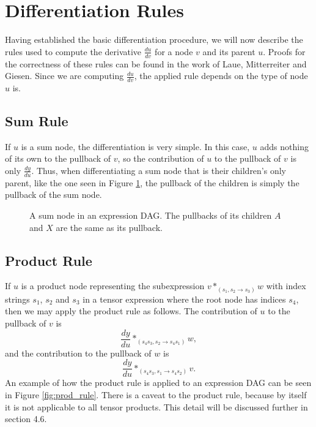 \documentclass[12pt, a4paper]{report}
\begin{document}
\section{Differentiation Rules}
Having established the basic differentiation procedure, we will now describe the rules used to compute the derivative $\frac{du}{dv}$ for a node $v$ and its parent $u$.
Proofs for the correctness of these rules can be found in the work \cite{tensorpaper} of Laue, Mitterreiter and Giesen.
Since we are computing $\frac{du}{dv}$, the applied rule depends on the type of node $u$ is.

\subsection{Sum Rule}
If $u$ is a sum node, the differentiation is very simple.
In this case, $u$ adds nothing of its own to the pullback of $v$, so the contribution of $u$ to the pullback of $v$ is only $\frac{dy}{du}$.
Thus, when differentiating a sum node that is their children's only parent, like the one seen in Figure \ref{fig:sum_rule}, the pullback of the children is simply the pullback of the sum node.

\begin{figure}
    \centering
    \caption[Example of Sum Rule Application]{A sum node in an expression DAG. The pullbacks of its children $A$ and $X$ are the same as its pullback.}
    \label{fig:sum_rule}
\end{figure}

\subsection{Product Rule}
If $u$ is a product node representing the subexpression $v *_{(s_1,s_2 \rightarrow s_3)} w$ with index strings $s_1$, $s_2$ and $s_3$ in a tensor expression where the root node has indices $s_4$, then we may apply the product rule as follows.
The contribution of $u$ to the pullback of $v$ is 
$$
\frac{dy}{du} *_{(s_4s_3,s_2 \rightarrow s_4s_1)} w,
$$
and the contribution to the pullback of $w$ is 
$$
\frac{dy}{du} *_{(s_4s_3,s_1 \rightarrow s_4s_2)} v.
$$
An example of how the product rule is applied to an expression DAG can be seen in Figure \ref{fig:prod_rule}.
There is a caveat to the product rule, because by itself it is not applicable to all tensor products.
This detail will be discussed further in section 4.6.
\end{document}
